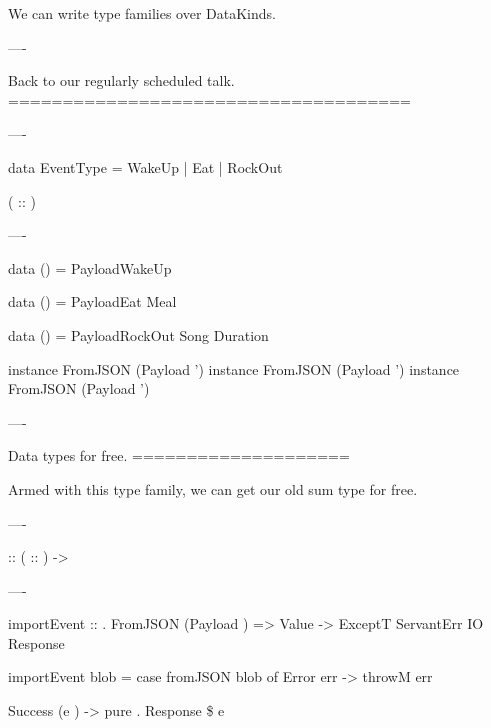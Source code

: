 We can write type families over DataKinds.

----

Back to our regularly scheduled talk.
=====================================

----

\begin{hs}

  data EventType = WakeUp | Eat | RockOut
\end{hs}

\begin{custom}
    ( :: )
\end{custom}

----

\begin{raw}
  data  () =
    PayloadWakeUp

  data  () =
    PayloadEat Meal

  data  () =
    PayloadRockOut Song Duration

  instance FromJSON (Payload ')
  instance FromJSON (Payload ')
  instance FromJSON (Payload ')
\end{raw}

----

Data types for free.
====================

Armed with this type family, we can get our old sum type for free.

----

\begin{custom}

    
     ::  ( :: ) -> 
\end{custom}

----

\begin{raw}

  importEvent :: 
               . FromJSON (Payload )
              => Value
              -> ExceptT ServantErr IO Response

  importEvent blob =
    case fromJSON blob of
      Error err ->
        throwM err

      Success (e ) ->
        pure . Response \$  e
\end{raw}

